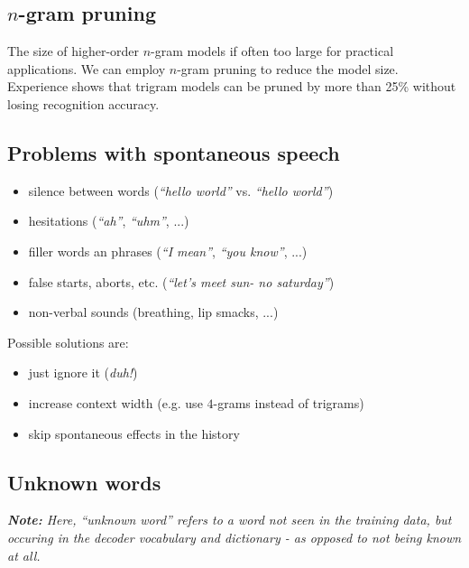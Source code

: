 \documentclass[11pt]{article}
\begin{document}
\subsection{$n$-gram pruning}
The size of higher-order $n$-gram models if often too large for practical applications. We can employ $n$-gram pruning to reduce the model size. Experience shows that trigram models can be pruned by more than 25\% without losing recognition accuracy.

\subsection{Problems with spontaneous speech}
\begin{itemize}
    \item silence between words (\textit{``hello world''} vs. \textit{``hello \hspace{5pt} world''})
    \item hesitations (\textit{``ah''}, \textit{``uhm''}, ...)
    \item filler words an phrases (\textit{``I mean''}, \textit{``you know''}, ...)
    \item false starts, aborts, etc. (\textit{``let's meet sun- no saturday''})
    \item non-verbal sounds (breathing, lip smacks, ...)
\end{itemize}

Possible solutions are:
\begin{itemize}
    \item just ignore it (\textit{duh!})
    \item increase context width (e.g. use $4$-grams instead of trigrams)
    \item skip spontaneous effects in the history
\end{itemize}

\subsection{Unknown words}

\vspace{5pt}
\textit{\textbf{Note:} Here, ``unknown word'' refers to a word not seen in the training data, but occuring in the decoder vocabulary and dictionary - as opposed to not being known at all.}
\vspace{10pt}
\end{document}
